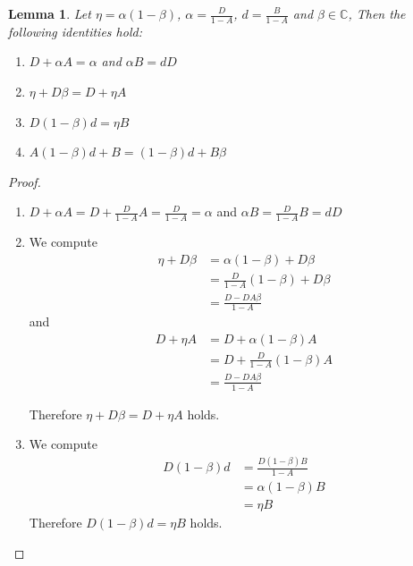 \documentclass[10pt,a4paper]{amsart}
\newtheorem{lemma}{Lemma}
\numberwithin{equation}{section}
\begin{document}
\begin{lemma}\label{l1}Let $\eta= \alpha(1-\beta)$, $\alpha=\frac{D}{1-A}$, $d=\frac{B}{1-A}$ and $\beta \in \mathbb{C}$, Then the following  identities hold:
\begin{enumerate}
\item $D+\alpha A = \alpha$ and $\alpha B= dD$
\item $\eta+D\beta= D+\eta A$ 
\item $D(1-\beta)d= \eta B$ 
\item $ A(1-\beta)d+B= (1-\beta)d+B\beta$
\end{enumerate}
\end{lemma}
\begin{proof}
    
       \begin{enumerate}
           \item $D+\alpha A= D+\frac{D}{1-A}A=\frac{D}{1-A}=\alpha$ and $\alpha B= \frac{D}{1-A} B= dD$\\
       \item We compute
       \begin{align*}
            \eta+D\beta &= \alpha(1-\beta)+D\beta\\
            &=\frac{D}{1-A}(1-\beta)+D\beta\\
            &= \frac{D-DA\beta}{1-A}
        \end{align*}  
        and
            \begin{align*}
            D+\eta A &= D+\alpha (1-\beta)A\\
            &= D+\frac{D}{1-A}(1-\beta)A\\
            &=\frac{D-DA\beta}{1-A}
        \end{align*}
        
        Therefore $\eta+D\beta= D+\eta A$ holds.\\
        \item  We compute
        \begin{align*}
        D(1-\beta)d &= \frac{D(1-\beta)B}{1-A}\\
        &= \alpha(1-\beta)B\\
        &= \eta B 
        \end{align*}
    Therefore $D(1-\beta)d= \eta B$ holds.\\
    

\end{enumerate}
\end{proof}
\end{document}
